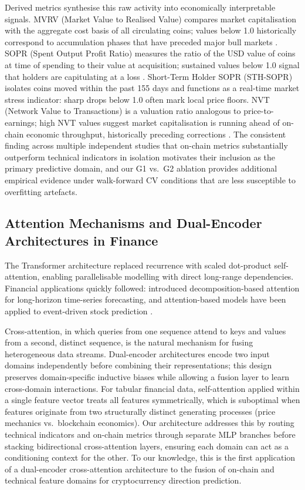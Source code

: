 \documentclass[final,3p,times,authoryear]{elsarticle}
\begin{document}
Derived metrics synthesise this raw activity into economically
interpretable signals.
MVRV (Market Value to Realised Value) compares market capitalisation with
the aggregate cost basis of all circulating coins; values below 1.0
historically correspond to accumulation phases that have preceded major
bull markets \citep{puell2018mvrv}.
SOPR (Spent Output Profit Ratio) measures the ratio of the USD value of
coins at time of spending to their value at acquisition; sustained values
below 1.0 signal that holders are capitulating at a loss \citep{shirakashi2019sopr}.
Short-Term Holder SOPR (STH-SOPR) isolates coins moved within the past
155 days and functions as a real-time market stress indicator: sharp drops
below 1.0 often mark local price floors.
NVT (Network Value to Transactions) is a valuation ratio analogous to
price-to-earnings; high NVT values suggest market capitalisation is running
ahead of on-chain economic throughput, historically preceding corrections
\citep{woo2017nvt}.
The consistent finding across multiple independent studies that on-chain
metrics substantially outperform technical indicators in isolation
\citep{omole2024financial, omole2025eaai} motivates their inclusion as
the primary predictive domain, and our G1 vs.\ G2 ablation provides
additional empirical evidence under walk-forward CV conditions that are
less susceptible to overfitting artefacts.

\subsection{Attention Mechanisms and Dual-Encoder Architectures in Finance}

The Transformer architecture \citep{vaswani2017attention} replaced
recurrence with scaled dot-product self-attention, enabling
parallelisable modelling with direct long-range dependencies.
Financial applications quickly followed: \citet{wu2021autoformer}
introduced decomposition-based attention for long-horizon time-series
forecasting, and attention-based models have been applied to
event-driven stock prediction \citep{ding2020transformer}.

Cross-attention, in which queries from one sequence attend to keys and
values from a second, distinct sequence, is the natural mechanism
for fusing heterogeneous data streams.
Dual-encoder architectures encode two input domains independently before
combining their representations; this design preserves domain-specific
inductive biases while allowing a fusion layer to learn cross-domain
interactions.
For tabular financial data, self-attention applied within a single
feature vector treats all features symmetrically, which is suboptimal
when features originate from two structurally distinct generating
processes (price mechanics vs.\ blockchain economics).
Our architecture addresses this by routing technical indicators and
on-chain metrics through separate MLP branches before stacking
bidirectional cross-attention layers, ensuring each domain can act as a
conditioning context for the other.
To our knowledge, this is the first application of a dual-encoder
cross-attention architecture to the fusion of on-chain and technical
feature domains for cryptocurrency direction prediction.
\end{document}
